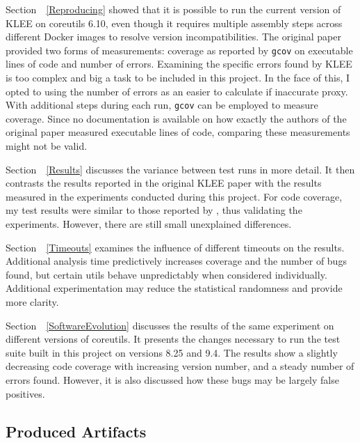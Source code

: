 \documentclass{article}
\let\savedRef=\ref
\renewcommand{\ref}{\unskip~\savedRef}
\begin{document}
Section~\ref{Reproducing} showed that it is possible to run the current version of KLEE on coreutils 6.10, even though it requires multiple assembly steps across different Docker images to resolve version incompatibilities. The original paper provided two forms of measurements: coverage as reported by \lstinline{gcov} on executable lines of code and number of errors. Examining the specific errors found by KLEE is too complex and big a task to be included in this project. In the face of this, I opted to using the number of errors as an easier to calculate if inaccurate proxy. With additional steps during each run, \lstinline{gcov} can be employed to measure coverage. Since no documentation is available on how exactly the authors of the original paper measured executable lines of code, comparing these measurements might not be valid.

Section~\ref{Results} discusses the variance between test runs in more detail. It then contrasts the results reported in the original KLEE paper with the results measured in the experiments conducted during this project. For code coverage, my test results were similar to those reported by \citeauthor{KLEE}, thus validating the experiments. However, there are still small unexplained differences.

Section~\ref{Timeouts} examines the influence of different timeouts on the results. Additional analysis time predictively increases coverage and the number of bugs found, but certain utils behave unpredictably when considered individually. Additional experimentation may reduce the statistical randomness and provide more clarity.

Section~\ref{SoftwareEvolution} discusses the results of the same experiment on different versions of coreutils. It presents the changes necessary to run the test suite built in this project on versions 8.25 and 9.4. The results show a slightly decreasing code coverage with increasing version number, and a steady number of errors found. However, it is also discussed how these bugs may be largely false positives.

\subsection{Produced Artifacts}
\end{document}
